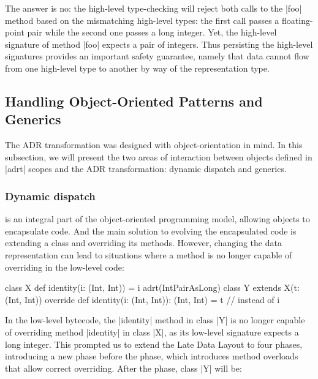 The answer is no: the high-level type-checking will reject both calls to the |foo| method based on the mismatching high-level types: the first call passes a floating-point pair while the second one passes a long integer. Yet, the high-level signature of method |foo| expects a pair of integers. Thus persisting the high-level signatures provides an important safety guarantee, namely that data cannot flow from one high-level type to another by way of the representation type.





\subsection{Handling Object-Oriented Patterns and Generics}
\label{sec:ildl:generics}

The ADR transformation was designed with object-orientation in mind. In this subsection, we will present the two areas of interaction between objects defined in |adrt| scopes and the ADR transformation: dynamic dispatch and generics.

\subsubsection{Dynamic dispatch }
is an integral part of the object-oriented programming model, allowing objects to encapsulate code. And the main solution to evolving the encapsulated code is extending a class and overriding its methods. However, changing the data representation can lead to situations where a method is no longer capable of overriding in the low-level code:

\begin{lstlisting-nobreak}
class X {
  def identity(i: (Int, Int)) = i
}
adrt(IntPairAsLong) {
  class Y extends X(t: (Int, Int)) {
    override def identity(i: (Int, Int)): (Int, Int) = t // instead of i
  }
}
\end{lstlisting-nobreak}

In the low-level bytecode, the |identity| method in class |Y| is no longer capable of overriding method |identity| in class |X|, as its low-level signature expects a long integer. This prompted us to extend the Late Data Layout to four phases, introducing a new \bridge{} phase before the \coerce{} phase, which introduces method overloads that allow correct overriding. After the \inject{} phase, class |Y| will be:

